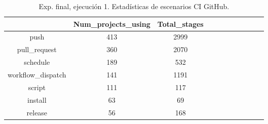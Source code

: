 \begin{table}[h]
  \centering
  \caption{Exp. final, ejecución 1. Estadísticas de escenarios CI GitHub.}
  \label{tab:tabla_f_1_4}

\begin{footnotesize}
\renewcommand{\arraystretch}{1.5} %
\begin{tabular}{ccccccccccc}
  \hline
  {} &  Num\_projects\_using &  Total\_stages \\
  \hline
  push                        &                 413 &          2999 \\
  pull\_request                &                 360 &          2070 \\
  schedule                    &                 189 &           532 \\
  workflow\_dispatch           &                 141 &          1191 \\
  script                      &                 111 &           117 \\
  install                     &                  63 &            69 \\
  release                     &                  56 &           168 \\

\end{tabular}
\end{footnotesize}
\end{table}
